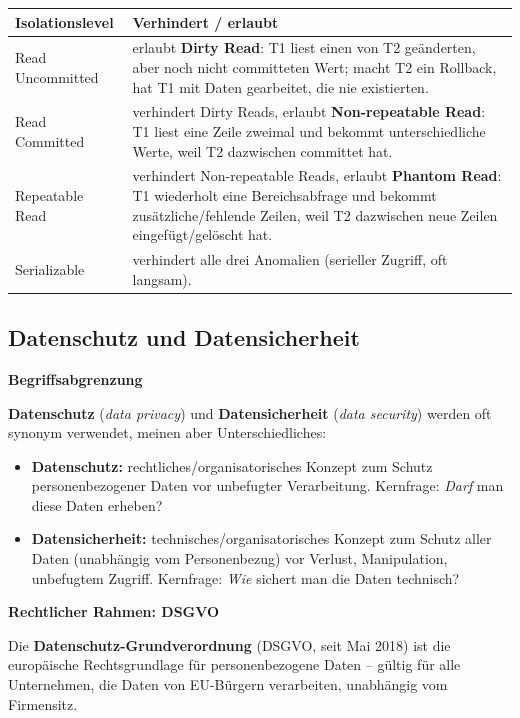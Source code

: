 \begin{table}[H]
  \centering
  \begin{tabularx}{\linewidth}{L{3.2cm} L{9.8cm}}
    \textbf{Isolationslevel} & \textbf{Verhindert / erlaubt} \\
    \midrule
    Read Uncommitted & erlaubt \textbf{Dirty Read}: T1 liest einen von T2 geänderten, aber noch nicht committeten Wert; macht T2 ein Rollback, hat T1 mit Daten gearbeitet, die nie existierten. \\
    Read Committed & verhindert Dirty Reads, erlaubt \textbf{Non-repeatable Read}: T1 liest eine Zeile zweimal und bekommt unterschiedliche Werte, weil T2 dazwischen committet hat. \\
    Repeatable Read & verhindert Non-repeatable Reads, erlaubt \textbf{Phantom Read}: T1 wiederholt eine Bereichsabfrage und bekommt zusätzliche/fehlende Zeilen, weil T2 dazwischen neue Zeilen eingefügt/gelöscht hat. \\
    Serializable & verhindert alle drei Anomalien (serieller Zugriff, oft langsam). \\
  \end{tabularx}
\end{table}

\newpage

\subsection{Datenschutz und Datensicherheit}

\textbf{Begriffsabgrenzung}

\textbf{Datenschutz} (\textit{data privacy}) und \textbf{Datensicherheit} (\textit{data security}) werden oft synonym verwendet, meinen aber Unterschiedliches:

\begin{itemize}[leftmargin=1.5em,noitemsep]
  \item \textbf{Datenschutz:} rechtliches/organisatorisches Konzept zum Schutz personenbezogener Daten vor unbefugter Verarbeitung. Kernfrage: \emph{Darf} man diese Daten erheben?
  \item \textbf{Datensicherheit:} technisches/organisatorisches Konzept zum Schutz aller Daten (unabhängig vom Personenbezug) vor Verlust, Manipulation, unbefugtem Zugriff. Kernfrage: \emph{Wie} sichert man die Daten technisch?
\end{itemize}

\textbf{Rechtlicher Rahmen: DSGVO}

Die \textbf{Datenschutz-Grundverordnung} (DSGVO, seit Mai 2018) ist die europäische Rechtsgrundlage für personenbezogene Daten -- gültig für alle Unternehmen, die Daten von EU-Bürgern verarbeiten, unabhängig vom Firmensitz.

